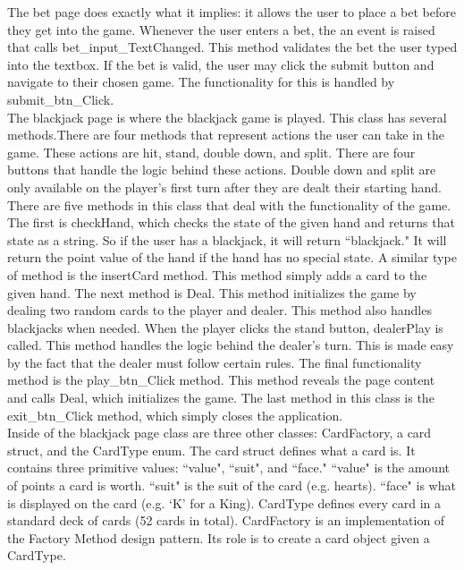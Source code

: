 \documentclass[10pt,conference,onecolumn,compsoc]{IEEEtran}
\begin{document}
\newline
The bet page does exactly what it implies: it allows the user to place a bet before they get into the game. Whenever the user enters a bet, the an event is raised that calls bet\_input\_TextChanged. This method validates the bet the user typed into the textbox. If the bet is valid, the user may click the submit button and navigate to their chosen game. The functionality for this is handled by submit\_btn\_Click.\\
\newline
The blackjack page is where the blackjack game is played. This class has several methods.There are four methods that represent actions the user can take in the game. These actions are hit, stand, double down, and split. There are four buttons that handle the logic behind these actions. Double down and split are only available on the player's first turn after they are dealt their starting hand. There are five methods in this class that deal with the functionality of the game. The first is checkHand, which checks the state of the given hand and returns that state as a string. So if the user has a blackjack, it will return ``blackjack." It will return the point value of the hand if the hand has no special state. A similar type of method is the insertCard method. This method simply adds a card to the given hand. The next method is Deal. This method initializes the game by dealing two random cards to the player and dealer. This method also handles blackjacks when needed. When the player clicks the stand button, dealerPlay is called. This method handles the logic behind the dealer's turn. This is made easy by the fact that the dealer must follow certain rules. The final functionality method is the play\_btn\_Click method. This method reveals the page content and calls Deal, which initializes the game. The last method in this class is the exit\_btn\_Click method, which simply closes the application.\\
\newline
Inside of the blackjack page class are three other classes: CardFactory, a card struct, and the CardType enum. The card struct defines what a card is. It contains three primitive values: ``value", ``suit", and ``face." ``value" is the amount of points a card is worth. ``suit" is the suit of the card (e.g. hearts). ``face" is what is displayed on the card (e.g. `K' for a King). CardType defines every card in a standard deck of cards (52 cards in total). CardFactory is an implementation of the Factory Method design pattern. Its role is to create a card object given a CardType.
\end{document}

